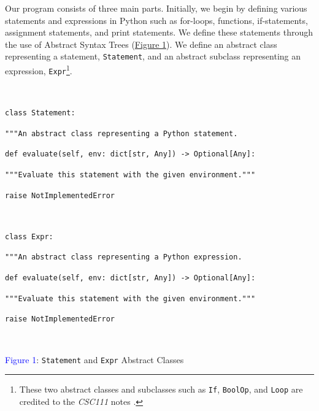 \documentclass[fontsize=11pt]{article}
\begin{document}
Our program consists of three main parts. Initially, we begin by defining various statements and expressions in Python such as for-loops, functions, if-statements, assignment statements, and print statements. We define these statements through the use of Abstract Syntax Trees (\hyperlink{fig1}{Figure 1}). We define an abstract class representing a statement, \texttt{Statement}, and an abstract subclass representing an expression, \texttt{Expr}\footnote{These two abstract classes and subclasses such as \texttt{If}, \texttt{BoolOp}, and \texttt{Loop} are credited to the \emph{CSC111} notes \cite{david}.}.

$ $

\hypertarget{fig1}{}

\texttt{\textcolor{keywordred}{class} \textcolor{keywordorange}{Statement}:}

\quad\quad \texttt{\textcolor{commentblue}{"""An abstract class representing a Python statement.}}

\quad\quad{\texttt{\textcolor{commentblue}{"""}}}

\quad\quad\texttt{\textcolor{keywordred}{def} \textcolor{keywordpurple}{evaluate}(self, env: \textcolor{keywordorange}{dict[str, Any]}) -> Optional[Any]:}

\quad\quad\texttt{"""Evaluate this statement with the given environment."""}

\quad\quad \quad\quad \texttt{\textcolor{keywordred}{raise} \textcolor{keywordorange}{NotImplementedError}}

$ $

\texttt{\textcolor{keywordred}{class} \textcolor{keywordorange}{Expr}:}

\quad\quad \texttt{\textcolor{commentblue}{"""An abstract class representing a Python expression.}}

\quad\quad{\texttt{\textcolor{commentblue}{"""}}}

\quad\quad\texttt{\textcolor{keywordred}{def} \textcolor{keywordpurple}{evaluate}(self, env: \textcolor{keywordorange}{dict[str, Any]}) -> Optional[Any]:}

\quad\quad\texttt{"""Evaluate this statement with the given environment."""}

\quad\quad \quad\quad \texttt{\textcolor{keywordred}{raise} \textcolor{keywordorange}{NotImplementedError}}

$ $

\begin{center}
    \small{\textcolor{blue}{Figure 1}: \texttt{Statement} and \texttt{Expr} Abstract Classes}
\end{center}
\end{document}
